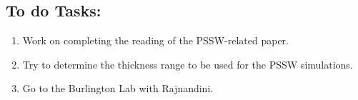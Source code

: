 \subsection*{To do Tasks:}
\begin{enumerate}
    \item Work on completing the reading of the PSSW-related paper.
    \item Try to determine the thickness range to be used for the PSSW simulations.
    \item Go to the Burlington Lab with Rajnandini.
\end{enumerate}
